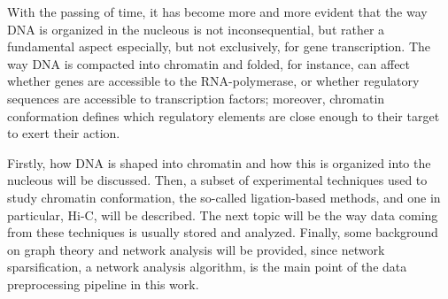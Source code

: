 
With the passing of time, it has become more and more evident that the way DNA is organized in the nucleous is not inconsequential, but rather a fundamental aspect especially, but not exclusively, for gene transcription\cite{chromatinfiber2015}. The way DNA is compacted into chromatin and folded, for instance, can affect whether genes are accessible to the RNA-polymerase, or whether regulatory sequences are accessible to transcription factors; moreover, chromatin conformation defines which regulatory elements are close enough to their target to exert their action.

Firstly, how DNA is shaped into chromatin and how this is organized into the nucleous will be discussed. Then, a subset of experimental techniques used to study chromatin conformation, the so-called ligation-based methods, and one in particular, Hi-C, will be described. The next topic will be the way data coming from these techniques is usually stored and analyzed. Finally, some background on graph theory and network analysis will be provided, since network sparsification, a network analysis algorithm, is the main point of the data preprocessing pipeline in this work.

